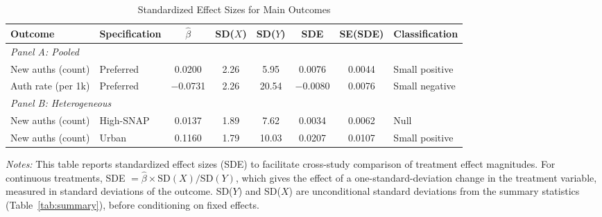 \begin{table}[H]
\centering
\caption{Standardized Effect Sizes for Main Outcomes}
\label{tab:sde}
\begin{adjustbox}{max width=\textwidth}
\begin{tabular}{llcccccl}
\toprule
Outcome & Specification & $\hat{\beta}$ & SD($X$) & SD($Y$) & SDE & SE(SDE) & Classification \\
\midrule
\multicolumn{8}{l}{\textit{Panel A: Pooled}} \\
New auths (count) & Preferred & 0.0200 & 2.26 & 5.95 & 0.0076 & 0.0044 & Small positive \\
Auth rate (per 1k) & Preferred & $-$0.0731 & 2.26 & 20.54 & $-$0.0080 & 0.0076 & Small negative \\
\midrule
\multicolumn{8}{l}{\textit{Panel B: Heterogeneous}} \\
New auths (count) & High-SNAP & 0.0137 & 1.89 & 7.62 & 0.0034 & 0.0062 & Null \\
New auths (count) & Urban & 0.1160 & 1.79 & 10.03 & 0.0207 & 0.0107 & Small positive \\
\bottomrule
\end{tabular}
\end{adjustbox}
\par\vspace{0.3em}
{\footnotesize \emph{Notes:} This table reports standardized effect sizes (SDE) to facilitate cross-study comparison of treatment effect magnitudes.
For continuous treatments, SDE $= \hat{\beta} \times \text{SD}(X) / \text{SD}(Y)$, which gives the effect of a one-standard-deviation change in the treatment variable, measured in standard deviations of the outcome.
SD($Y$) and SD($X$) are unconditional standard deviations from the summary statistics (Table~\ref{tab:summary}), before conditioning on fixed effects.

}
\end{table}
